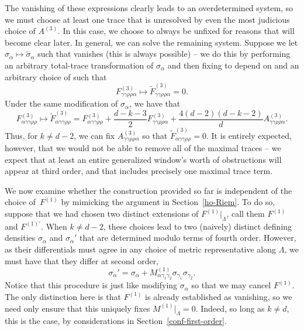 \documentclass[pdftex]{sigma}
\numberwithin{equation}{section}
\renewcommand{\=}{\stackrel \Lambda =}
\begin{document}
The vanishing of these expressions clearly leads to an overdetermined system, so we must choose at least one trace that is unresolved by even the most judicious choice of $A^{(3)}$. In this case, we choose  to always be unfixed for reasons that will become clear later. In general, we can solve the remaining system. Suppose we let $\sigma_{\alpha} \mapsto \tilde{\sigma}_{\alpha}$ such that  vanishes (this is always possible) -- we do this by performing an arbitrary total-trace transformation of $\sigma_{\alpha}$ and then fixing  to depend on  and an arbitrary choice of  such that
\[{F}^{(3)}_{\gamma \gamma \rho \rho \alpha} \mapsto \tilde{F}^{(3)}_{\gamma \gamma \rho \rho \alpha} = 0 .\]
Under the same modification of $\sigma_{\alpha}$, we have that
\[F^{(3)}_{\alpha \gamma \gamma \rho \rho} \mapsto \tilde{F}^{(3)}_{\alpha \gamma \gamma \rho \rho} = F^{(3)}_{\alpha \gamma \gamma \rho \rho} + \frac{d-k-3}{2} F^{(3)}_{\gamma \gamma \rho \rho \alpha} + \frac{4(d-2)(d-k-2)}{d} A^{(3)}_{\gamma \gamma \rho \rho \alpha} .\]
Thus, for $k\neq d-2$, we can fix $A^{(3)}_{\gamma \gamma \rho \rho \alpha}$ so that $\tilde{F}^{(3)}_{\alpha \gamma \gamma \rho \rho} = 0$. It is entirely expected, however, that we would not be able to remove all of the maximal traces -- we expect that at least an entire generalized window's worth of obstructions will appear at third order, and that includes precisely one maximal trace term.

We now examine whether the construction provided so far is independent of the choice of~$F^{(1)}$ by mimicking the argument in Section~\ref{ho-Riem}. To do so, suppose that we had chosen two distinct extensions of $F^{(1)}|_{\Lambda}$, call them $F^{(1)}$ and $F^{(1)'}$. When $k\neq d-2$, these choices lead to two (naively) distinct defining densities $\sigma_{\alpha}$ and $\sigma_{\alpha}'$ that are determined modulo terms of fourth order. However, as their differentials must agree in any choice of metric representative along $\Lambda$, we must have that they differ at second order,
\[\sigma_{\alpha}' = \sigma_{\alpha} + M^{(1)}_{\alpha \gamma_1 \gamma_2} \sigma_{\gamma_1} \sigma_{\gamma_2} .\]
Notice that this procedure is just like modifying $\sigma_{\alpha}$ so that we may cancel $F^{(1)}$. The only distinction here is that $F^{(1)}$ is already established as vanishing, so we need only ensure that this uniquely fixes $M^{(1)}|_{\Lambda} = 0$. Indeed, so long as $k \neq d$, this is the case, by considerations in Section~\ref{conf-first-order}.
\end{document}
